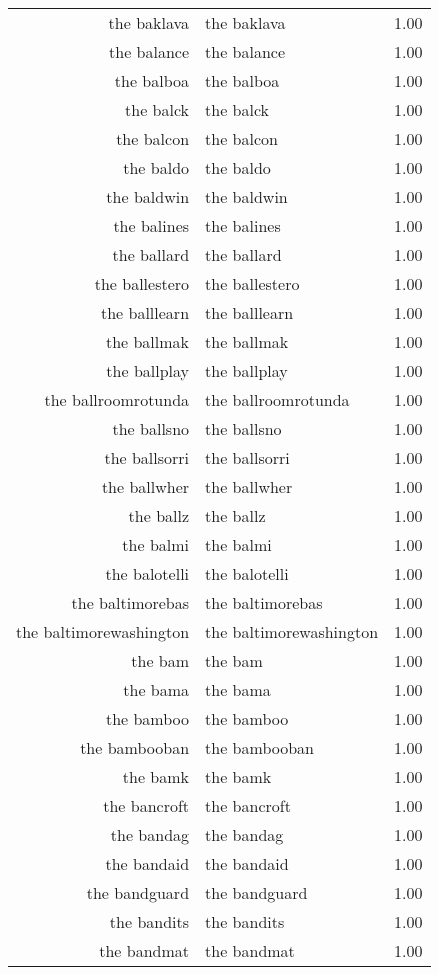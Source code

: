 \begin{table}[ht]
\begin{tabular}{rlr}
  the baklava & the baklava & 1.00 \\ 
  the balance & the balance & 1.00 \\ 
  the balboa & the balboa & 1.00 \\ 
  the balck & the balck & 1.00 \\ 
  the balcon & the balcon & 1.00 \\ 
  the baldo & the baldo & 1.00 \\ 
  the baldwin & the baldwin & 1.00 \\ 
  the balines & the balines & 1.00 \\ 
  the ballard & the ballard & 1.00 \\ 
  the ballestero & the ballestero & 1.00 \\ 
  the balllearn & the balllearn & 1.00 \\ 
  the ballmak & the ballmak & 1.00 \\ 
  the ballplay & the ballplay & 1.00 \\ 
  the ballroomrotunda & the ballroomrotunda & 1.00 \\ 
  the ballsno & the ballsno & 1.00 \\ 
  the ballsorri & the ballsorri & 1.00 \\ 
  the ballwher & the ballwher & 1.00 \\ 
  the ballz & the ballz & 1.00 \\ 
  the balmi & the balmi & 1.00 \\ 
  the balotelli & the balotelli & 1.00 \\ 
  the baltimorebas & the baltimorebas & 1.00 \\ 
  the baltimorewashington & the baltimorewashington & 1.00 \\ 
  the bam & the bam & 1.00 \\ 
  the bama & the bama & 1.00 \\ 
  the bamboo & the bamboo & 1.00 \\ 
  the bambooban & the bambooban & 1.00 \\ 
  the bamk & the bamk & 1.00 \\ 
  the bancroft & the bancroft & 1.00 \\ 
  the bandag & the bandag & 1.00 \\ 
  the bandaid & the bandaid & 1.00 \\ 
  the bandguard & the bandguard & 1.00 \\ 
  the bandits & the bandits & 1.00 \\ 
  the bandmat & the bandmat & 1.00 \\ 

\end{tabular}
\end{table}
